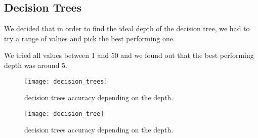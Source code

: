 
\subsection{Decision Trees}%
\label{sub:decision-trees}
We decided that in order to find the ideal depth of the decision tree, we had to try a range of values and pick the best performing one.

We tried all values between 1 and 50 and we found out that the best performing depth was around 5. 

\begin{figure}[H]
    \centering
    \texttt{[image: decision\_trees]}
    \caption{decision trees accuracy depending on the depth.}%
    \label{fig:decision_trees_acc}
\end{figure}

\begin{figure}[H]
    \centering
    \texttt{[image: decision\_tree]}
    \caption{decision trees accuracy depending on the depth.}%
    \label{fig:decision_trees}
\end{figure}

